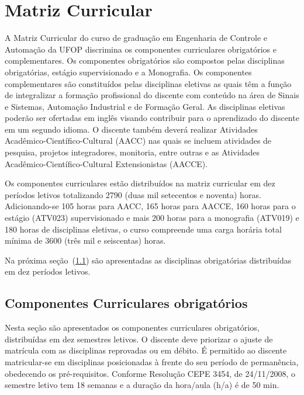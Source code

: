 \documentclass[
	12pt,				%
	openright,			%
	oneside,			%
	a4paper,			%
	english,			%
	brazil				%
	]{abntex2}
\begin{document}
\section{Matriz Curricular} \label{sec:matriz}

A Matriz Curricular do curso de graduação em Engenharia de Controle e Automação da UFOP discrimina os componentes curriculares obrigatórios e complementares. Os componentes obrigatórios são compostos pelas disciplinas obrigatórias, estágio supervisionado e a Monografia. Os componentes complementares são constituídos pelas disciplinas eletivas 	as quais têm a função de integralizar a formação profissional do discente com conteúdo na área de Sinais e Sistemas, Automação Industrial e de Formação Geral. As disciplinas eletivas poderão ser ofertadas em inglês visando contribuir para o aprendizado do discente em um segundo idioma. O discente também deverá realizar Atividades Acadêmico-Científico-Cultural (AACC) nas quais se incluem atividades de pesquisa, projetos integradores, monitoria, entre outras e as Atividades Acadêmico-Científico-Cultural Extensionistas (AACCE).

Os componentes curriculares estão distribuídos na matriz curricular em dez períodos letivos totalizando 2790 (duas mil setecentos e noventa) horas. Adicionando-se 105 horas para AACC, 165 horas para AACCE, 160 horas para o estágio (ATV023) supervisionado e mais 200 horas para a monografia (ATV019) e 180 horas de disciplinas eletivas, o curso compreende uma carga horária total mínima de 3600 (três mil e seiscentas) horas.

%
Na próxima seção~(\ref{tab:0402}) são apresentadas as disciplinas obrigatórias distribuídas em dez períodos letivos.

\subsection{Componentes Curriculares obrigatórios}\label{tab:0402}

Nesta seção são apresentados os componentes curriculares obrigatórios, distribuídas em dez semestres letivos. O discente deve priorizar o ajuste de matrícula com as disciplinas reprovadas ou em débito. É permitido ao discente matricular-se em disciplinas posicionadas à frente do seu período de permanência, obedecendo os pré-requisitos. Conforme Resolução CEPE 3454, de 24/11/2008, o semestre letivo tem 18 semanas e a duração da hora/aula (h/a) é de 50 min.


\end{document}
